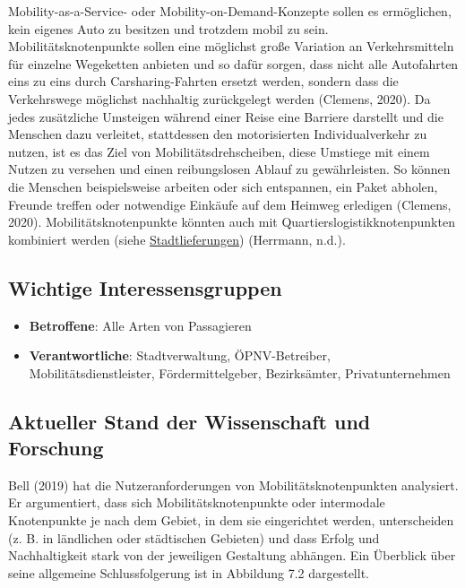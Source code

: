 \documentclass[
]{book}
\providecommand{\tightlist}{%
  \setlength{\itemsep}{0pt}\setlength{\parskip}{0pt}}
\begin{document}
Mobility-as-a-Service- oder Mobility-on-Demand-Konzepte sollen es ermöglichen, kein eigenes Auto zu besitzen und trotzdem mobil zu sein. Mobilitätsknotenpunkte sollen eine möglichst große Variation an Verkehrsmitteln für einzelne Wegeketten anbieten und so dafür sorgen, dass nicht alle Autofahrten eins zu eins durch Carsharing-Fahrten ersetzt werden, sondern dass die Verkehrswege möglichst nachhaltig zurückgelegt werden (Clemens, 2020). Da jedes zusätzliche Umsteigen während einer Reise eine Barriere darstellt und die Menschen dazu verleitet, stattdessen den motorisierten Individualverkehr zu nutzen, ist es das Ziel von Mobilitätsdrehscheiben, diese Umstiege mit einem Nutzen zu versehen und einen reibungslosen Ablauf zu gewährleisten. So können die Menschen beispielsweise arbeiten oder sich entspannen, ein Paket abholen, Freunde treffen oder notwendige Einkäufe auf dem Heimweg erledigen (Clemens, 2020). Mobilitätsknotenpunkte könnten auch mit Quartierslogistikknotenpunkten kombiniert werden (siehe \protect\hyperlink{urban_delivery}{Stadtlieferungen}) (Herrmann, n.d.).

\hypertarget{wichtige-interessensgruppen-28}{%
\subsection*{Wichtige Interessensgruppen}\label{wichtige-interessensgruppen-28}}

\begin{itemize}
\tightlist
\item
  \textbf{Betroffene}: Alle Arten von Passagieren
\item
  \textbf{Verantwortliche}: Stadtverwaltung, ÖPNV-Betreiber, Mobilitätsdienstleister, Fördermittelgeber, Bezirksämter, Privatunternehmen
\end{itemize}

\hypertarget{aktueller-stand-der-wissenschaft-und-forschung-28}{%
\subsection*{Aktueller Stand der Wissenschaft und Forschung}\label{aktueller-stand-der-wissenschaft-und-forschung-28}}

Bell (2019) hat die Nutzeranforderungen von Mobilitätsknotenpunkten analysiert. Er argumentiert, dass sich Mobilitätsknotenpunkte oder intermodale Knotenpunkte je nach dem Gebiet, in dem sie eingerichtet werden, unterscheiden (z. B. in ländlichen oder städtischen Gebieten) und dass Erfolg und Nachhaltigkeit stark von der jeweiligen Gestaltung abhängen. Ein Überblick über seine allgemeine Schlussfolgerung ist in Abbildung 7.2 dargestellt.
\end{document}
